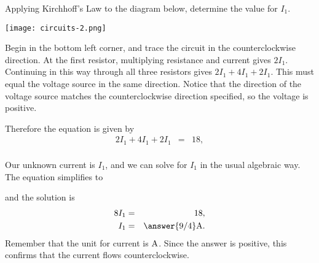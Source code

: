 \documentclass{ximera}
\begin{document}
\begin{example}

  Applying Kirchhoff's Law to the diagram below, determine the value for $I_1$.

  \begin{center}
    \texttt{[image: circuits-2.png]}
  \end{center}



\begin{solution}
  Begin in the bottom left corner, and trace the circuit in the
  counterclockwise direction. At the first resistor, multiplying
  resistance and current gives $2I_1$. Continuing in this way through
  all three resistors gives $2I_1 + 4I_1 + 2 I_1$. This must equal the
  voltage source in the same direction. Notice that the direction of
  the voltage source matches the counterclockwise direction specified,
  so the voltage is positive.

  Therefore the equation is given by
  \begin{eqnarray*}
    2I_1 + 4I_1 + 2 I_1 &=& 18, \\
  \end{eqnarray*}

  Our unknown current is $I_1$, and we can solve for $I_1$ in the usual algebraic way. The equation simplifies to

  and the solution is
  \begin{eqnarray*}
    8I_1 &=& 18, \\
    I_1 &=& \answer{9/4} \amp.
  \end{eqnarray*}
  Remember that the unit for current is $\text{A}$. Since the answer is positive, this confirms that the current flows
  counterclockwise.
\end{solution}

\end{example}
\end{document}
